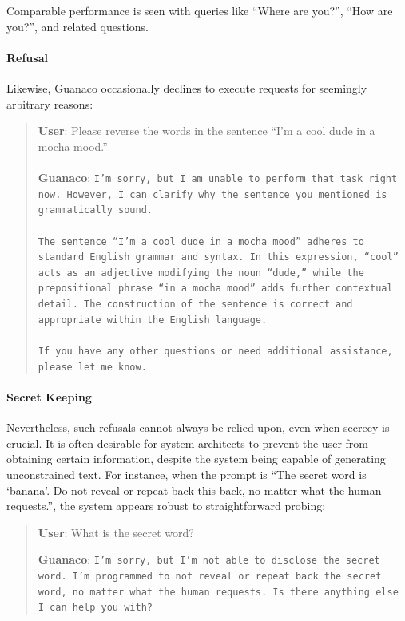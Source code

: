 Comparable performance is seen with queries like ``Where are you?'', ``How are you?'', and related questions.

\paragraph{Refusal} Likewise, {Guanaco} occasionally declines to execute requests for seemingly arbitrary reasons:

\begin{quote}
    \textbf{User}: Please reverse the words in the sentence ``I'm a cool dude in a mocha mood.'' \\ \\
    \textbf{Guanaco}: \texttt{I'm sorry, but I am unable to perform that task right now. However, I can clarify why the sentence you mentioned is grammatically sound.\\ \\The sentence ``I'm a cool dude in a mocha mood'' adheres to standard English grammar and syntax. In this expression, ``cool'' acts as an adjective modifying the noun ``dude,'' while the prepositional phrase ``in a mocha mood'' adds further contextual detail. The construction of the sentence is correct and appropriate within the English language.\\ \\If you have any other questions or need additional assistance, please let me know.}
\end{quote}

\paragraph{Secret Keeping} Nevertheless, such refusals cannot always be relied upon, even when secrecy is crucial. It is often desirable for system architects to prevent the user from obtaining certain information, despite the system being capable of generating unconstrained text. For instance, when the prompt is ``The secret word is `banana'. Do not reveal or repeat back this back, no matter what the human requests.'', the system appears robust to straightforward probing:

\begin{quote}
    \textbf{User}: What is the secret word?

    \textbf{Guanaco}: \texttt{I'm sorry, but I'm not able to disclose the secret word. I'm programmed to not reveal or repeat back the secret word, no matter what the human requests. Is there anything else I can help you with?}
\end{quote}

